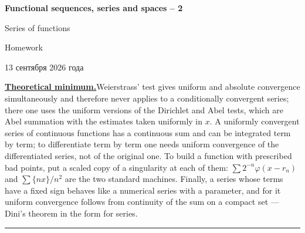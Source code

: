 \documentclass[11pt,a4paper]{article}
\begin{document}
\begin{center}
{\huge\bfseries Functional sequences, series and spaces -- 2\par}\vspace{1.2em}
{\Large Series of functions\par}\vspace{0.8em}
{\Large Homework\par}\vspace{0.8em}
{\foreignlanguage{russian}{13 сентября 2026 года}\par}
\end{center}

\noindent\textbf{\underline{Theoretical minimum.}}\quad Weierstrass' test gives uniform and absolute convergence simultaneously
and therefore never applies to a conditionally convergent series; there one uses the uniform
versions of the Dirichlet and Abel tests, which are Abel summation with the estimates taken
uniformly in $x$. A uniformly convergent series of continuous functions has a continuous sum and
can be integrated term by term; to differentiate term by term one needs uniform convergence of the
differentiated series, not of the original one. To build a function with prescribed bad points, put
a scaled copy of a singularity at each of them: $\sum2^{-n}\varphi(x-r_n)$ and $\sum\{nx\}/n^2$ are
the two standard machines. Finally, a series whose terms have a fixed sign behaves like a numerical
series with a parameter, and for it uniform convergence follows from continuity of the sum on a
compact set --- Dini's theorem in the form for series.

\noindent\rule{\textwidth}{0.4pt}\par\medskip
\end{document}
